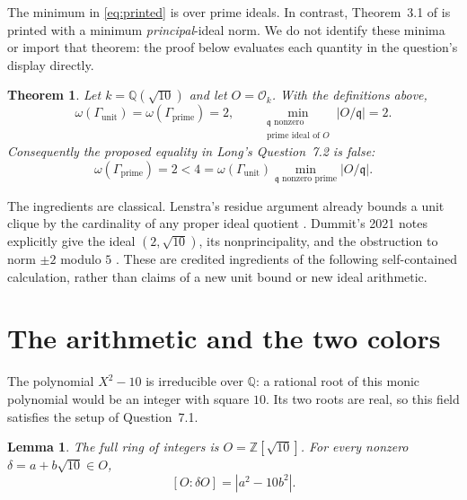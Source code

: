 \documentclass[11pt,letterpaper]{article}
\newcommand{\Z}{\mathbb Z}
\newcommand{\Q}{\mathbb Q}
\newcommand{\OO}{\mathcal O}
\newcommand{\Gu}{\Gamma_{\mathrm{unit}}}
\newcommand{\Gp}{\Gamma_{\mathrm{prime}}}
\newtheorem{theorem}{Theorem}
\newtheorem{lemma}{Lemma}
\begin{document}
The minimum in \eqref{eq:printed} is over prime ideals. In contrast,
Theorem~3.1 of \cite[p.~573]{long} is printed with a minimum
\emph{principal}-ideal norm. We do not identify these minima or import
that theorem: the proof below evaluates each quantity in the question's
display directly.

\begin{theorem}\label{thm:main}
Let $k=\Q(\sqrt{10})$ and let $O=\OO_k$. With the definitions above,
\[
 \omega(\Gu)=\omega(\Gp)=2,
 \qquad
 \min_{\substack{\mathfrak q\text{ nonzero}\\
                  \text{prime ideal of }O}}|O/\mathfrak q|=2.
\]
Consequently the proposed equality in Long's Question~7.2 is false:
\[
 \omega(\Gp)=2<4
   =\omega(\Gu)
     \min_{\mathfrak q\text{ nonzero prime}}|O/\mathfrak q|.
\]
\end{theorem}

The ingredients are classical. Lenstra's residue argument already bounds
a unit clique by the cardinality of any proper ideal quotient
\cite[Proposition~2.2, p.~242]{lenstra}. Dummit's 2021 notes explicitly
give the ideal $(2,\sqrt{10})$, its nonprincipality, and the obstruction
to norm $\pm2$ modulo $5$ \cite[p.~13]{dummit}. These are credited
ingredients of the following self-contained calculation, rather than
claims of a new unit bound or new ideal arithmetic.

\section{The arithmetic and the two colors}

The polynomial $X^2-10$ is irreducible over $\Q$: a rational root of this
monic polynomial would be an integer with square $10$. Its two roots are
real, so this field satisfies the setup of Question~7.1.

\begin{lemma}\label{lem:ring}
The full ring of integers is $O=\Z[\sqrt{10}]$. For every nonzero
$\delta=a+b\sqrt{10}\in O$,
\begin{equation}\label{eq:index}
 [O:\delta O]=|a^2-10b^2|.
\end{equation}
\end{lemma}
\end{document}
